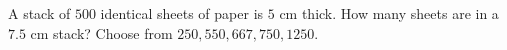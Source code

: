 A stack of $500$ identical sheets of paper is $5$ cm thick. How many sheets are in a $7.5$ cm stack? Choose from $250,550,667,750,1250$.
